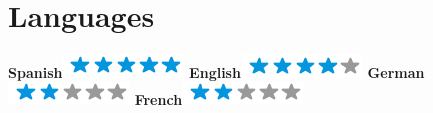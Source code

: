 \begin{aside}
    ~
    ~
    ~
    ~
    ~
    ~
    ~
    ~
    ~
    ~
    ~
    ~
    ~
    ~
    ~
    ~
    ~
    ~
    ~
    ~
    ~
    ~
    ~
    ~
    ~
    ~
    ~
    \section{Languages}
    \textbf{Spanish}\includegraphics[scale=0.40]{img/5stars.png}
    \textbf{English}\includegraphics[scale=0.40]{img/4stars.png}
    \textbf{German}\includegraphics[scale=0.40]{img/2stars.png}
    \textbf{French}\includegraphics[scale=0.40]{img/2stars.png}
\end{aside}
